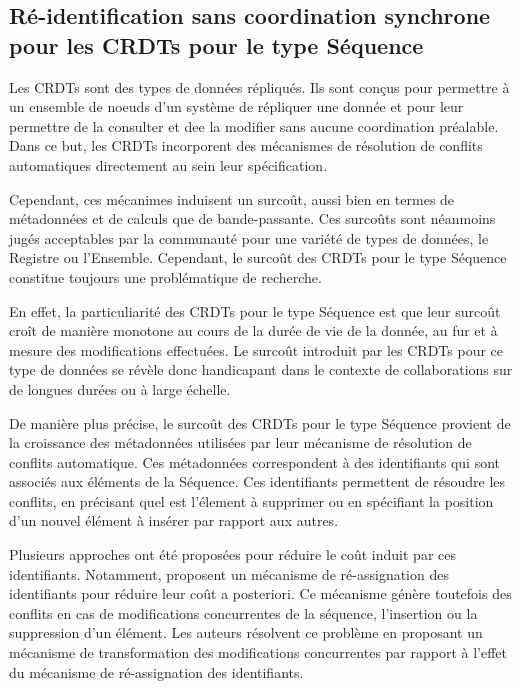 \subsection{Ré-identification sans coordination synchrone pour les \acp{CRDT} pour le type Séquence}
\label{sec:research-questions-rls}

Les \acfp{CRDT} \cite{2007-crdt-shapiro,shapiro_2011_crdt} sont des types de données répliqués.
Ils sont conçus pour permettre à un ensemble de noeuds d'un système de répliquer une donnée et pour leur permettre de la consulter et dee la modifier sans aucune coordination préalable.
Dans ce but, les \acp{CRDT} incorporent des mécanismes de résolution de conflits automatiques directement au sein leur spécification.

Cependant, ces mécanimes induisent un surcoût, aussi bien en termes de métadonnées et de calculs que de bande-passante.
Ces surcoûts sont néanmoins jugés acceptables par la communauté pour une variété de types de données, \eg le Registre ou l'Ensemble.
Cependant, le surcoût des \acp{CRDT} pour le type Séquence constitue toujours une problématique de recherche.

En effet, la particuliarité des \acp{CRDT} pour le type Séquence est que leur surcoût croît de manière monotone au cours de la durée de vie de la donnée, \ie au fur et à mesure des modifications effectuées.
Le surcoût introduit par les \acp{CRDT} pour ce type de données se révèle donc handicapant dans le contexte de collaborations sur de longues durées ou à large échelle.

De manière plus précise, le surcoût des \acp{CRDT} pour le type Séquence provient de la croissance des métadonnées utilisées par leur mécanisme de résolution de conflits automatique.
Ces métadonnées correspondent à des identifiants qui sont associés aux éléments de la Séquence.
Ces identifiants permettent de résoudre les conflits, \eg en précisant quel est l'élement à supprimer ou en spécifiant la position d'un nouvel élément à insérer par rapport aux autres.

Plusieurs approches ont été proposées pour réduire le coût induit par ces identifiants.
Notamment, \cite{letia:hal-01248270,zawirski:hal-01248197} proposent un mécanisme de ré-assignation des identifiants pour réduire leur coût a posteriori.
Ce mécanisme génère toutefois des conflits en cas de modifications concurrentes de la séquence, \ie l'insertion ou la suppression d'un élément.
Les auteurs résolvent ce problème en proposant un mécanisme de transformation des modifications concurrentes par rapport à l'effet du mécanisme de ré-assignation des identifiants.

